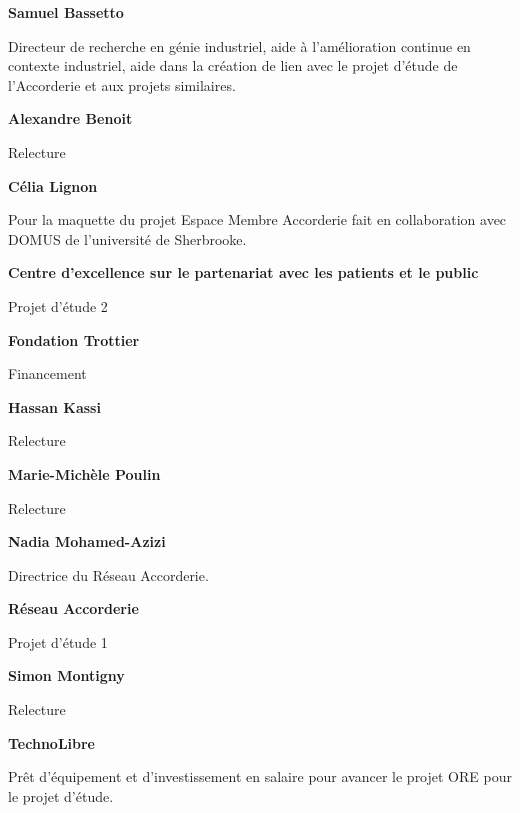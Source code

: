 %

%

\textbf{Samuel Bassetto}

Directeur de recherche en génie industriel, aide à l’amélioration continue en contexte industriel, aide dans la création de lien avec le projet d’étude de l’Accorderie et aux projets similaires.

\textbf{Alexandre Benoit}

Relecture

\textbf{Célia Lignon}

Pour la maquette du projet Espace Membre Accorderie fait en collaboration avec DOMUS de l’université de Sherbrooke.

\textbf{Centre d'excellence sur le partenariat avec les patients et le public}

Projet d’étude 2

\textbf{Fondation Trottier}

Financement

\textbf{Hassan Kassi}

Relecture

\textbf{Marie-Michèle Poulin}

Relecture

\textbf{Nadia Mohamed-Azizi}

Directrice du Réseau Accorderie.

\textbf{Réseau Accorderie}

Projet d’étude 1

\textbf{Simon Montigny}

Relecture

\textbf{TechnoLibre}

Prêt d’équipement et d'investissement en salaire pour avancer le projet ORE pour le projet d’étude.
